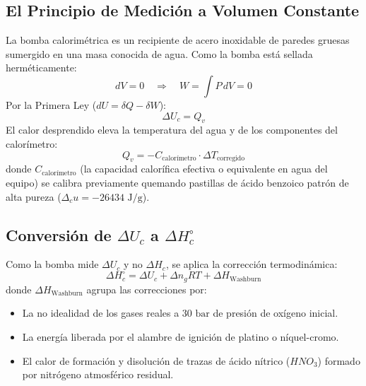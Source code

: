 \documentclass[11pt,letterpaper]{report}
\begin{document}
\subsection{El Principio de Medición a Volumen Constante}
La bomba calorimétrica es un recipiente de acero inoxidable de paredes gruesas sumergido en una masa conocida de agua. Como la bomba está sellada herméticamente:
\begin{equation}
    dV = 0 \quad \Longrightarrow \quad W = \int P\,dV = 0
\end{equation}
Por la Primera Ley ($dU = \delta Q - \delta W$):
\begin{equation}
    \Delta U_c = Q_v
\end{equation}
El calor desprendido eleva la temperatura del agua y de los componentes del calorímetro:
\begin{equation}
    Q_v = - C_{\text{calor\'imetro}} \cdot \Delta T_{\text{corregido}}
\end{equation}
donde $C_{\text{calor\'imetro}}$ (la capacidad calorífica efectiva o equivalente en agua del equipo) se calibra previamente quemando pastillas de ácido benzoico patrón de alta pureza ($\Delta_c u = -26434\text{ J/g}$).

\subsection{Conversión de $\Delta U_c$ a $\Delta H_c^\circ$}
Como la bomba mide $\Delta U_c$ y no $\Delta H_c$, se aplica la corrección termodinámica:
\begin{equation}
    \Delta H_c^\circ = \Delta U_c + \Delta n_g R T + \Delta H_{\text{Washburn}}
\end{equation}
donde $\Delta H_{\text{Washburn}}$ agrupa las correcciones por:
\begin{itemize}[leftmargin=*]
    \item La no idealidad de los gases reales a $30\text{ bar}$ de presión de oxígeno inicial.
    \item La energía liberada por el alambre de ignición de platino o níquel-cromo.
    \item El calor de formación y disolución de trazas de ácido nítrico ($HNO_3$) formado por nitrógeno atmosférico residual.
\end{itemize}
\end{document}
